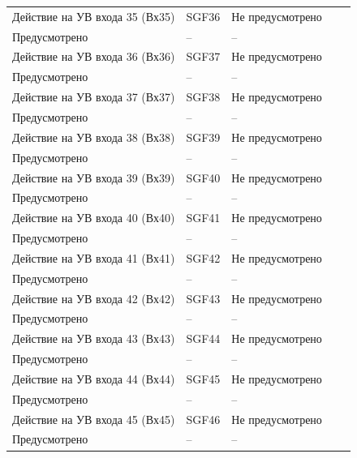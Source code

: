 \begin{longtable}{|>{\centering\arraybackslash}m{5.3cm}|>{\centering\arraybackslash}m{3.3cm}|>{\centering\arraybackslash}m{4.2cm}|>{\centering\arraybackslash}m{1.8cm}|>{\centering\arraybackslash}m{1cm}|}
\hline
\centering Действие на УВ входа 35 (Вх35)  & \centering SGF36 & \centering Не предусмотрено \\ Предусмотрено & \centering -- & \centering \arraybackslash -- \\
\hline
\centering Действие на УВ входа 36 (Вх36)  & \centering SGF37 & \centering Не предусмотрено \\ Предусмотрено & \centering -- & \centering \arraybackslash -- \\
\hline
\centering Действие на УВ входа 37 (Вх37)  & \centering SGF38 & \centering Не предусмотрено \\ Предусмотрено & \centering -- & \centering \arraybackslash -- \\
\hline
\centering Действие на УВ входа 38 (Вх38)  & \centering SGF39 & \centering Не предусмотрено \\ Предусмотрено & \centering -- & \centering \arraybackslash -- \\
\hline
\centering Действие на УВ входа 39 (Вх39)  & \centering SGF40 & \centering Не предусмотрено \\ Предусмотрено & \centering -- & \centering \arraybackslash -- \\
\hline
\centering Действие на УВ входа 40 (Вх40)  & \centering SGF41 & \centering Не предусмотрено \\ Предусмотрено & \centering -- & \centering \arraybackslash -- \\
\hline
\centering Действие на УВ входа 41 (Вх41)  & \centering SGF42 & \centering Не предусмотрено \\ Предусмотрено & \centering -- & \centering \arraybackslash -- \\
\hline
\centering Действие на УВ входа 42 (Вх42)  & \centering SGF43 & \centering Не предусмотрено \\ Предусмотрено & \centering -- & \centering \arraybackslash -- \\
\hline
\centering Действие на УВ входа 43 (Вх43)  & \centering SGF44 & \centering Не предусмотрено \\ Предусмотрено & \centering -- & \centering \arraybackslash -- \\
\hline
\centering Действие на УВ входа 44 (Вх44)  & \centering SGF45 & \centering Не предусмотрено \\ Предусмотрено & \centering -- & \centering \arraybackslash -- \\
\hline
\centering Действие на УВ входа 45 (Вх45)  & \centering SGF46 & \centering Не предусмотрено \\ Предусмотрено & \centering -- & \centering \arraybackslash -- \\

\end{longtable}
